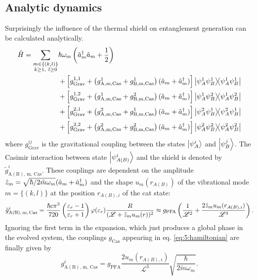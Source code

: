 \subsection{Analytic dynamics}
Surprisingly the influence of the thermal shield on entanglement generation can be calculated analytically.
\begin{align}\label{eq:5:hamiltonian}
\begin{split}
  \hat{H} = \sum_{\substack{m\in\{(k,l)\}\\ k \geq 1,\ l \geq 0}} & \hbar \omega_m \left(\hat{a}^\dagger_m \hat{a}_m + \frac{1}{2}\right) \\
  &+ \left[g^{1,1}_\mathrm{Grav} + \left(g^1_\mathrm{A,m,Cas} +
  g^1_\mathrm{B,m,Cas}\right)(\hat{a}_m + \hat{a}^\dagger_m)\right] \ketbra{\psi^1_A \psi^1_B} \\
  &+ \left[g^{1,2}_\mathrm{Grav} + \left(g^1_\mathrm{A,m,Cas} + g^2_\mathrm{B,m,Cas}\right)(\hat{a}_m + \hat{a}^\dagger_m)\right]\ketbra{\psi^1_A \psi^2_B} \\
  &+ \left[g^{2,1}_\mathrm{Grav} + \left(g^2_\mathrm{A,m,Cas} + g^1_\mathrm{B,m,Cas}\right)(\hat{a}_m + \hat{a}^\dagger_m)\right]\ketbra{\psi^2_A \psi^1_B} \\
  &+ \left[g^{2,2}_\mathrm{Grav} + \left(g^2_\mathrm{A,m,Cas} + g^2_\mathrm{B,m,Cas}\right)(\hat{a}_m + \hat{a}^\dagger_m)\right]\ketbra{\psi^2_A \psi^2_B}
\end{split}
\end{align}
where $g^{ij}_\mathrm{Grav}$ is the gravitational coupling between the states $\ket{\psi^i_A}$ and $\ket{\psi^j_B}$.
The Casimir interaction between state $\ket{\psi_{A(B)}^i}$ and the shield is denoted by $\tilde{g}^i_\mathrm{A(B),\,m,\,Cas}$. These couplings are dependent on the amplitude $\hat{z}_{m} = \sqrt{\hbar/2\tilde{m}\omega_m} (\hat{a}_m + \hat{a}^\dagger_m)$ and the shape $u_{m}(r_{A(B)})$ of the vibrational mode $m=\{(k,l)\}$ at the position $r_{A(B),i}$ of the cat state:
\begin{equation}
  \tilde{g}^i_\mathrm{A(B),\,m,\,Cas} = \frac{\hbar c \pi^3}{720} \left(\frac{\varepsilon_r - 1}{\varepsilon_r + 1}\right)\varphi(\varepsilon_r) \frac{R}{(\mathscr{L} + \hat{z}_m u_m(r))^2} \approx g_\mathrm{PFA} \left(\frac{1}{\mathscr{L}^2} + \frac{2 \hat{z}_m u_m(r_{A(B),i})}{\mathscr{L}^3}\right) .
\end{equation}
Ignoring the first term in the expansion, which just produces a global phase in the evolved system, the couplings $g_\mathrm{Cas}$ appearing in eq. \eqref{eq:5:hamiltonian} are finally given by
\begin{equation}
  g^i_\mathrm{A(B),\,m,\,Cas} = g_\mathrm{PFA} \frac{2u_m(r_{A(B),i})}{\mathscr{L}^3} \sqrt{\frac{\hbar}{2 \tilde{m} \omega_m}} .
\end{equation}
